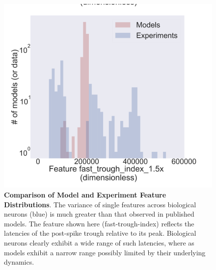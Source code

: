 \begin{figure}
    \centering
    \includegraphics[scale=0.5]{figures/fast_trough}
    \caption[Comparison of Model and Experiment Feature Distributions (A)]{\textbf{Comparison of Model and Experiment Feature Distributions}. The variance of single features across biological neurons (blue) is much greater than that observed in published models.
    The feature shown here (fast-trough-index) reflects the latencies of the post-spike trough relative to its peak.
    Biological neurons clearly exhibit a wide range of such latencies, where as models exhibit a narrow range possibly limited by their underlying dynamics.
    }
    \label{fig:from-poster-disagree}
\end{figure}


